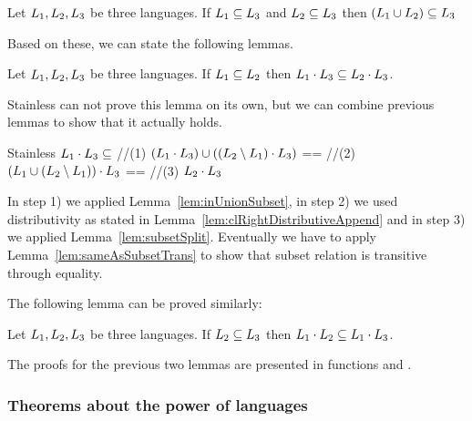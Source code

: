 \begin{lemma}
	\label{lem:unionSubset}
	Let $L_{1}, L_{2}, L_{3}$ be three languages. If $L_{1} \subseteq L_{3}$ and $L_{2} \subseteq L_{3}$ then $(L_{1} \cup L_{2})\subseteq L_{3}$
\end{lemma}

Based on these, we can state the following lemmas.

\begin{lemma}
	\label{lem:concatSubset}
	Let $L_{1}, L_{2}, L_{3}$ be three languages. If $L_{1} \subseteq L_{2}$ then $L_{1} \cdot L_{3} \subseteq L_{2} \cdot L_{3}$.
\end{lemma}

Stainless can not prove this lemma on its own, but we can combine previous lemmas to show that it actually holds.

\begin{ShortCode}{Stainless}
 $L_{1} \cdot L_{3} \subseteq $ //(1)
 $(L_{1}  \cdot L_{3}) \cup ((L_{2} \setminus L_{1}) \cdot L_{3}) $ == //(2)
 $(L_{1} \cup (L_{2} \setminus L_{1})) \cdot L_{3} $        == //(3)
 $L_{2} \cdot L_{3}$
\end{ShortCode}

In step 1) we applied Lemma~\ref{lem:inUnionSubset}, in step 2) we used distributivity as stated in Lemma~\ref{lem:clRightDistributiveAppend} and in step 3) we applied Lemma~\ref{lem:subsetSplit}. Eventually we have to apply Lemma~\ref{lem:sameAsSubsetTrans} to show that subset relation is transitive through equality.

The following lemma can be proved similarly:
\begin{lemma}
	\label{lem:concatSubset2}
	Let $L_{1}, L_{2}, L_{3}$ be three languages. If $L_{2} \subseteq L_{3}$ then $L_{1} \cdot L_{2} \subseteq L_{1} \cdot L_{3}$.
\end{lemma}

The proofs for the previous two lemmas are presented in functions  and .

\subsubsection{Theorems about the power of languages}

